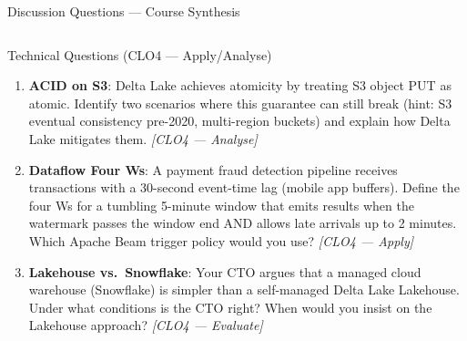 \documentclass[aspectratio=169,10pt]{beamer}
\begin{document}
\begin{frame}{Discussion Questions — Course Synthesis}
  \begin{columns}[T]
      \begin{block}{Technical Questions \textmd{\tiny (CLO4 — Apply/Analyse)}}
        \begin{enumerate}
          \item \textbf{ACID on S3}: Delta Lake achieves atomicity
                by treating S3 object PUT as atomic.
                Identify two scenarios where this guarantee can
                still break (hint: S3 eventual consistency pre-2020,
                multi-region buckets) and explain how Delta Lake
                mitigates them.
                \textit{[CLO4 — Analyse]}

          \item \textbf{Dataflow Four Ws}: A payment fraud detection
                pipeline receives transactions with a 30-second
                event-time lag (mobile app buffers).
                Define the four Ws for a tumbling 5-minute window
                that emits results when the watermark passes the
                window end AND allows late arrivals up to 2 minutes.
                Which Apache Beam trigger policy would you use?
                \textit{[CLO4 — Apply]}

          \item \textbf{Lakehouse vs.\ Snowflake}: Your CTO argues
                that a managed cloud warehouse (Snowflake) is simpler
                than a self-managed Delta Lake Lakehouse.
                Under what conditions is the CTO right?
                When would you insist on the Lakehouse approach?
                \textit{[CLO4 — Evaluate]}
        \end{enumerate}
      \end{block}


\end{columns}
\end{frame}
\end{document}
